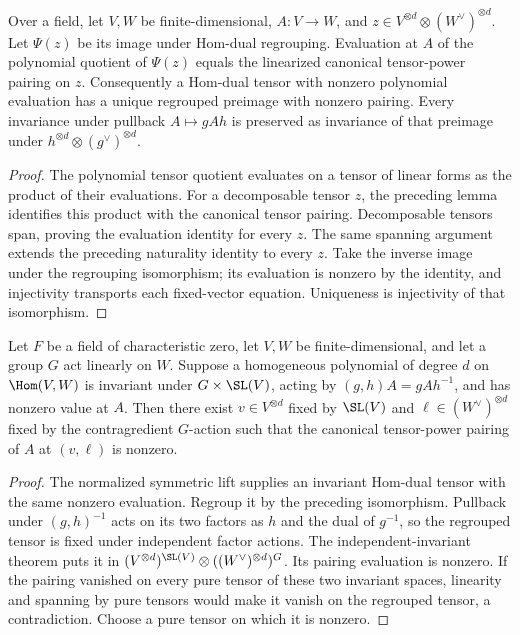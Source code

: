 \begin{lemma}
\label{lem:hom-polynomial-regrouped-evaluation}
\leanok
Over a field, let $V,W$ be finite-dimensional, $A:V\to W$, and
$z\in V^{\otimes d}\otimes(W^\vee)^{\otimes d}$. Let $\Psi(z)$ be
its image under Hom-dual regrouping. Evaluation at $A$ of the polynomial
quotient of $\Psi(z)$ equals the linearized canonical tensor-power
pairing on $z$. Consequently a Hom-dual tensor with nonzero polynomial
evaluation has a unique regrouped preimage with nonzero pairing. Every
invariance under pullback $A\mapsto gAh$ is preserved as invariance of
that preimage under $h^{\otimes d}\otimes(g^\vee)^{\otimes d}$.
\end{lemma}
\begin{proof}
The polynomial tensor quotient evaluates on a tensor of linear forms
as the product of their evaluations. For a decomposable tensor $z$,
the preceding lemma identifies this product with the canonical tensor
pairing. Decomposable tensors span, proving the evaluation identity
for every $z$. The same spanning argument extends the preceding
naturality identity to every $z$. Take the inverse image under the
regrouping isomorphism; its evaluation is nonzero by the identity,
and injectivity transports each fixed-vector equation. Uniqueness
is injectivity of that isomorphism.
\end{proof}

\begin{lemma}
\label{lem:hom-independent-invariant-pairing}
\leanok
Let $F$ be a field of characteristic zero, let $V,W$ be finite-dimensional,
and let a group $G$ act linearly on $W$. Suppose a homogeneous polynomial
of degree $d$ on $\Hom(V,W)$ is invariant under $G\times\SL(V)$,
acting by $(g,h)A=gAh^{-1}$, and has nonzero value at $A$.
Then there exist $v\in V^{\otimes d}$ fixed by $\SL(V)$ and
$\ell\in(W^\vee)^{\otimes d}$ fixed by the contragredient $G$-action
such that the canonical tensor-power pairing of $A$ at $(v,\ell)$ is nonzero.
\end{lemma}
\begin{proof}
The normalized symmetric lift supplies an invariant Hom-dual tensor with
the same nonzero evaluation. Regroup it by the preceding isomorphism.
Pullback under $(g,h)^{-1}$ acts on its two factors as $h$ and the dual
of $g^{-1}$, so the regrouped tensor is fixed under independent factor
actions. The independent-invariant theorem puts it in
$(V^{\otimes d})^{\SL(V)}\otimes((W^\vee)^{\otimes d})^G$.
Its pairing evaluation is nonzero. If the pairing vanished on every
pure tensor of these two invariant spaces, linearity and spanning by
pure tensors would make it vanish on the regrouped tensor, a
contradiction. Choose a pure tensor on which it is nonzero.
\end{proof}

